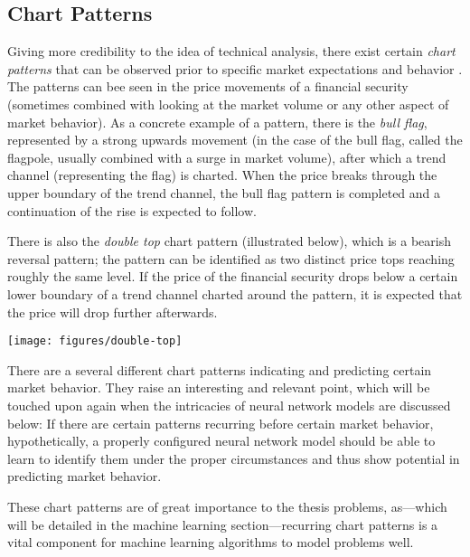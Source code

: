 \begin{multicols}{2}
\subsection{Chart Patterns}

Giving more credibility to the idea of technical analysis, there exist certain
\textit{chart patterns} that can be observed prior to specific market
expectations and behavior \citep{technicalanalysis2010}. The patterns can bee
seen in the price movements of a financial security (sometimes combined with
looking at the market volume or any other aspect of market behavior).  As a
concrete example of a pattern, there is the \textit{bull flag}, represented by a
strong upwards movement (in the case of the bull flag, called the flagpole,
usually combined with a surge in market volume), after which a trend channel
(representing the flag) is charted.  When the price breaks through the upper
boundary of the trend channel, the bull flag pattern is completed and a
continuation of the rise is expected to follow.

There is also the \textit{double top} chart pattern (illustrated below), which
is a bearish reversal pattern; the pattern can be identified as two distinct
price tops reaching roughly the same level.  If the price of the financial
security drops below a certain lower boundary of a trend channel charted around
the pattern, it is expected that the price will drop further afterwards.

\begin{Figure}
  \texttt{[image: figures/double-top]}
\end{Figure}

\noindent There are a several different chart patterns indicating and predicting
certain market behavior.  They raise an interesting and relevant point, which
will be touched upon again when the intricacies of neural network models are
discussed below: If there are certain patterns recurring before certain market
behavior, hypothetically, a properly configured neural network model should be
able to learn to identify them under the proper circumstances and thus show
potential in predicting market behavior.

These chart patterns are of great importance to the thesis problems, as---which
will be detailed in the machine learning section---recurring chart patterns is a
vital component for machine learning algorithms to model problems well.


\end{multicols}
